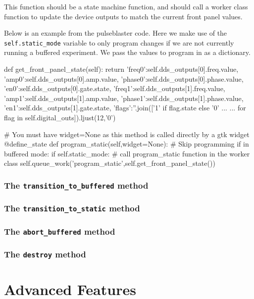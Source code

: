 \documentclass[12pt]{article}
\begin{document}
This function should be a state machine function, and should call a worker class function to update the device outputs to match the current front panel values.

Below is an example from the pulseblaster code. Here we make use of the \texttt{self.static\_mode} variable to only program changes if we are not currently running a buffered experiment. We pass the values to program in as a dictionary.

\begin{python}
    def get_front_panel_state(self):
        return {'freq0':self.dds_outputs[0].freq.value,
                'amp0':self.dds_outputs[0].amp.value,
                'phase0':self.dds_outputs[0].phase.value,
                'en0':self.dds_outputs[0].gate.state,
                'freq1':self.dds_outputs[1].freq.value,
                'amp1':self.dds_outputs[1].amp.value,
                'phase1':self.dds_outputs[1].phase.value,
                'en1':self.dds_outputs[1].gate.state,
                'flags':''.join(['1' if flag.state else '0' ...
                ... for flag in self.digital_outs]).ljust(12,'0')}
    
    # You must have widget=None as this method is called directly by a gtk widget
    @define_state
    def program_static(self,widget=None):
        # Skip programming if in buffered mode:
        if self.static_mode:
        	# call program_static function in the worker class
            self.queue_work('program_static',self.get_front_panel_state())
\end{python}

\subsubsection{The \texttt{transition\_to\_buffered} method}\label{device_class_transition_to_buffered}

\subsubsection{The \texttt{transition\_to\_static} method}\label{device_class_transition_to_static}

\subsubsection{The \texttt{abort\_buffered} method}\label{device_class_abort_buffered}

\subsubsection{The \texttt{destroy} method}\label{device_class_destroy}

\section{Advanced Features}
\end{document}

